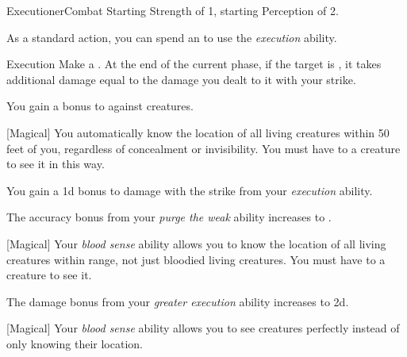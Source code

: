     \begin{feat}{Executioner}{Combat}
        \featpres Starting Strength of 1, starting Perception of 2.

         As a standard action, you can spend an  to use the \textit{execution} ability.
        \begin{ability}{Execution}
            Make a .
            At the end of the current phase, if the target is , it takes additional damage equal to the damage you dealt to it with your strike.
        \end{ability}

         You gain a  bonus to  against  creatures.

        [Magical] You automatically know the location of all  living creatures within 50 feet of you, regardless of concealment or invisibility.
        You must have  to a creature to see it in this way.

         You gain a \plus1d bonus to damage with the strike from your \textit{execution} ability.

         The accuracy bonus from your \textit{purge the weak} ability increases to .

        [Magical] Your \textit{blood sense} ability allows you to know the location of all living creatures within range, not just bloodied living creatures.
        You must have  to a creature to see it.

         The damage bonus from your \textit{greater execution} ability increases to \plus2d.

        [Magical] Your \textit{blood sense} ability allows you to see creatures perfectly instead of only knowing their location.
    \end{feat}

